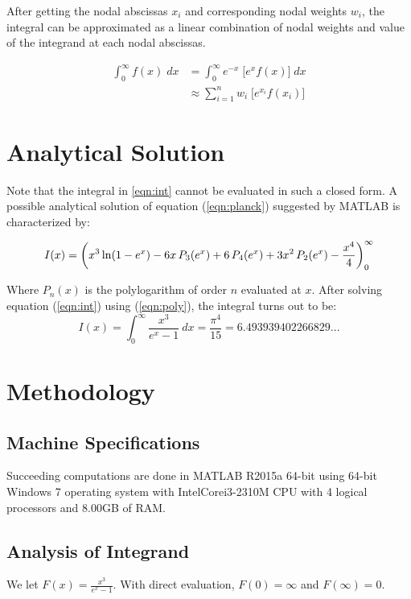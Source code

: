 \documentclass[a4paper, 11pt]{article}
\begin{document}
After getting the nodal abscissas $x_i$ and corresponding nodal weights $w_i$, the integral can be approximated as a linear combination of nodal weights and value of the integrand at each nodal abscissas.

\begin{align}
\int_{0}^{\infty}f(x)\;dx &= \int_{0}^{\infty}e^{-x}\;\lbrack e^xf(x) \rbrack\;dx \\
&\approx \sum_{i=1}^{n}w_i\;\lbrack e^{x_i}f(x_i) \rbrack
\end{align}

\section{Analytical Solution}
Note that the integral in \ref{eqn:int} cannot be evaluated in such a closed form. A possible analytical solution of equation (\ref{eqn:planck}) suggested by MATLAB is characterized by:

\begin{equation}\label{eqn:int}
	I(x) = \left( x^3 \ln(1-e^x) - 6x \, \mathnormal{P}_3(e^x) + 6 \, \mathnormal{P}_4(e^x) + 3x^2 \, \mathnormal{P}_2(e^x) - \frac{x^4}{4} \right) _0 ^ {\infty}
\end{equation}

Where $P_n(x)$ is the polylogarithm of order $n$ evaluated at $x$. After solving equation (\ref{eqn:int}) using (\ref{eqn:poly}), the integral turns out to be:
\begin{equation}
I(x) = \int_0^{\infty} \frac{x^3}{e^x-1} \ dx = \frac{\pi^4}{15} = 6.493939402266829\ldots
\end{equation}

\section{Methodology}
\subsection{Machine Specifications}
Succeeding computations are done in MATLAB R2015a 64-bit using 64-bit Windows 7 operating system with Intel\textregistered \hfil Core\texttrademark \hfil i3-2310M CPU with 4 logical processors and 8.00GB of RAM.

\subsection{Analysis of Integrand}
We let $F(x) = \frac{x^3}{e^x-1}$. With direct evaluation, $F(0)=\infty$ and $F(\infty)=0$. 
\end{document}
